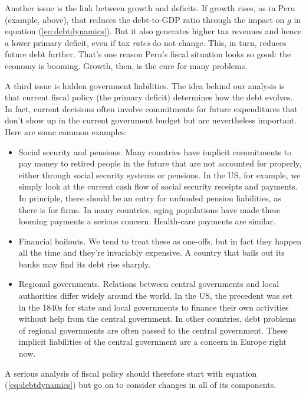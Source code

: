 \documentclass[letterpaper,12pt]{article}
\begin{document}
Another issue is the link between growth and deficits.
If growth rises, as in Peru (example, above),
that reduces the debt-to-GDP ratio through
the impact on $g$ in equation (\ref{eq:debtdynamics}).
But it also generates higher tax revenues and hence
a lower primary deficit, even if tax {\it rates\/}
do not change.
This, in turn, reduces future debt further.
That's one reason Peru's fiscal situation looks so good:
the economy is booming.
Growth, then, is the cure for many problems.

A third issue is hidden government liabilities.
The idea behind our analysis
is that current fiscal policy (the primary deficit)
determines how the debt evolves.
In fact, current decisions often involve commitments
for future expenditures that don't show up in the
current government budget but are nevertheless important.
Here are some common examples:
%
\begin{itemize}
\item Social security and pensions.
Many countries have implicit commitments to pay
money to retired people in the future
that are not accounted for properly,
either through social security systems or pensions.
In the US, for example, we simply look at the current cash flow of
social security receipts and payments.
In principle, there should be an entry for unfunded pension
liabilities,
as there is for firms.
In many countries, aging populations have made these looming payments
a serious concern.
Health-care payments are similar.

\item Financial bailouts.
We tend to treat these as one-offs, but in fact they happen all the time and they're invariably expensive.
A country that bails out its banks may find its debt rise sharply.

\item Regional governments.
Relations between central governments and local authorities
differ widely around the world.
In the US, the precedent was set in the 1840s for state and local
governments to finance their own activities without help from
the central government.
In other countries, debt problems of regional governments are often
passed to the central government.
These implicit liabilities of the central government are a concern
in Europe right now.
\end{itemize}

A serious analysis of fiscal policy should therefore
start with equation (\ref{eq:debtdynamics})
but go on to consider changes in all of its
components.
\end{document}
